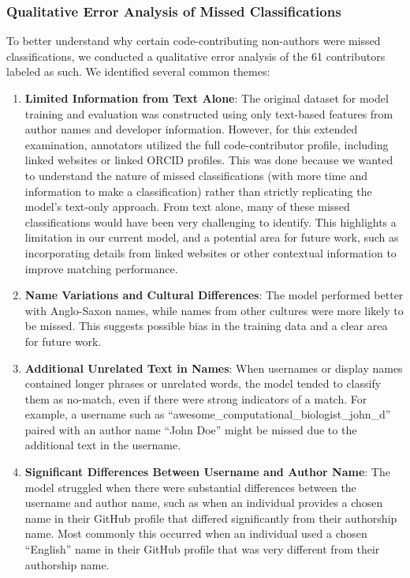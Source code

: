 \documentclass[
  letterpaper,
  DIV=11,
  numbers=noendperiod]{scrartcl}
\providecommand{\tightlist}{%
  \setlength{\itemsep}{0pt}\setlength{\parskip}{0pt}}
\begin{document}
\subsubsection{Qualitative Error Analysis of Missed
Classifications}\label{sec-appendix-cc-na-error-analysis}

To better understand why certain code-contributing non-authors were
missed classifications, we conducted a qualitative error analysis of the
61 contributors labeled as such. We identified several common themes:

\begin{enumerate}
\def\labelenumi{\arabic{enumi}.}
\tightlist
\item
  \textbf{Limited Information from Text Alone}: The original dataset for
  model training and evaluation was constructed using only text-based
  features from author names and developer information. However, for
  this extended examination, annotators utilized the full
  code-contributor profile, including linked websites or linked ORCID
  profiles. This was done because we wanted to understand the nature of
  missed classifications (with more time and information to make a
  classification) rather than strictly replicating the model's text-only
  approach. From text alone, many of these missed classifications would
  have been very challenging to identify. This highlights a limitation
  in our current model, and a potential area for future work, such as
  incorporating details from linked websites or other contextual
  information to improve matching performance.
\item
  \textbf{Name Variations and Cultural Differences}: The model performed
  better with Anglo-Saxon names, while names from other cultures were
  more likely to be missed. This suggests possible bias in the training
  data and a clear area for future work.
\item
  \textbf{Additional Unrelated Text in Names}: When usernames or display
  names contained longer phrases or unrelated words, the model tended to
  classify them as no-match, even if there were strong indicators of a
  match. For example, a username such as
  ``awesome\_computational\_biologist\_john\_d'' paired with an author
  name ``John Doe'' might be missed due to the additional text in the
  username.
\item
  \textbf{Significant Differences Between Username and Author Name}: The
  model struggled when there were substantial differences between the
  username and author name, such as when an individual provides a chosen
  name in their GitHub profile that differed significantly from their
  authorship name. Most commonly this occurred when an individual used a
  chosen ``English'' name in their GitHub profile that was very
  different from their authorship name.
\end{enumerate}
\end{document}
